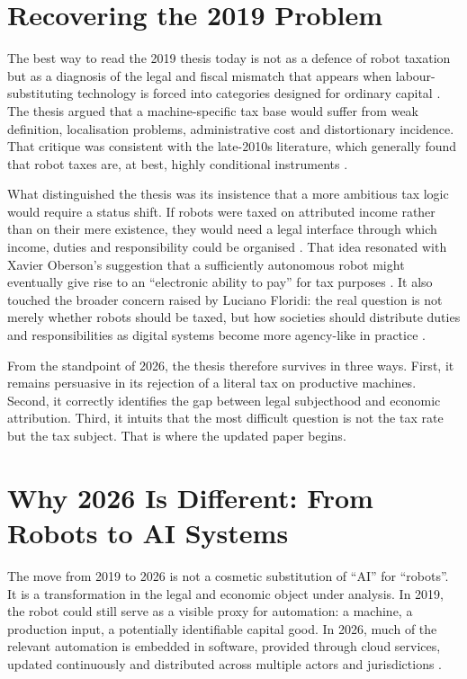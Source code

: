 \documentclass[11pt]{article}
\begin{document}
\section{Recovering the 2019 Problem}
The best way to read the 2019 thesis today is not as a defence of robot taxation but as a diagnosis of the legal and fiscal mismatch that appears when labour-substituting technology is forced into categories designed for ordinary capital \citep{graz2019}. The thesis argued that a machine-specific tax base would suffer from weak definition, localisation problems, administrative cost and distortionary incidence. That critique was consistent with the late-2010s literature, which generally found that robot taxes are, at best, highly conditional instruments \citep{guerreiro2019,thuemmel2018,gasteiger2017,acemoglu2018modeling}.

What distinguished the thesis was its insistence that a more ambitious tax logic would require a status shift. If robots were taxed on attributed income rather than on their mere existence, they would need a legal interface through which income, duties and responsibility could be organised \citep{graz2019}. That idea resonated with Xavier Oberson's suggestion that a sufficiently autonomous robot might eventually give rise to an ``electronic ability to pay'' for tax purposes \citep{oberson2017}. It also touched the broader concern raised by Luciano Floridi: the real question is not merely whether robots should be taxed, but how societies should distribute duties and responsibilities as digital systems become more agency-like in practice \citep{floridi2017}.

From the standpoint of 2026, the thesis therefore survives in three ways. First, it remains persuasive in its rejection of a literal tax on productive machines. Second, it correctly identifies the gap between legal subjecthood and economic attribution. Third, it intuits that the most difficult question is not the tax rate but the tax subject. That is where the updated paper begins.

\section{Why 2026 Is Different: From Robots to AI Systems}
The move from 2019 to 2026 is not a cosmetic substitution of ``AI'' for ``robots''. It is a transformation in the legal and economic object under analysis. In 2019, the robot could still serve as a visible proxy for automation: a machine, a production input, a potentially identifiable capital good. In 2026, much of the relevant automation is embedded in software, provided through cloud services, updated continuously and distributed across multiple actors and jurisdictions \citep{oecd2025adoption,oecd2025sme,wef2025jobs}.
\end{document}
